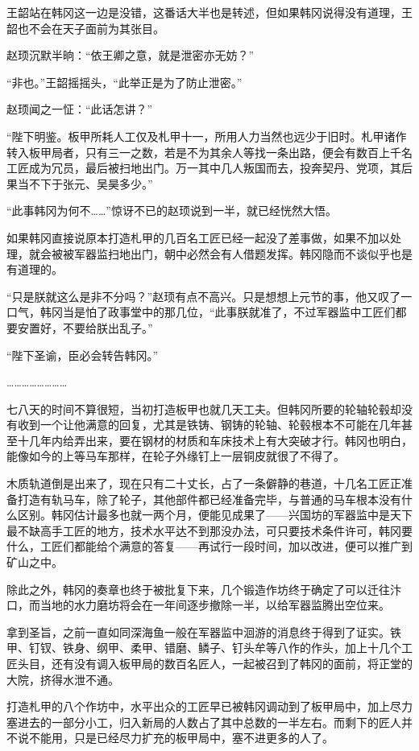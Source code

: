 王韶站在韩冈这一边是没错，这番话大半也是转述，但如果韩冈说得没有道理，王韶也不会在天子面前为其张目。

赵顼沉默半晌：“依王卿之意，就是泄密亦无妨？”

“非也。”王韶摇摇头，“此举正是为了防止泄密。”

赵顼闻之一怔：“此话怎讲？”

“陛下明鉴。板甲所耗人工仅及札甲十一，所用人力当然也远少于旧时。札甲诸作转入板甲局者，只有三一之数，若是不为其余人等找一条出路，便会有数百上千名工匠成为冗员，最后被扫地出门。万一其中几人叛国而去，投奔契丹、党项，其后果当不下于张元、吴昊多少。”

“此事韩冈为何不……”惊讶不已的赵顼说到一半，就已经恍然大悟。

如果韩冈直接说原本打造札甲的几百名工匠已经一起没了差事做，如果不加以处理，就会被被军器监扫地出门，朝中必然会有人借题发挥。韩冈隐而不谈似乎也是有道理的。

“只是朕就这么是非不分吗？”赵顼有点不高兴。只是想想上元节的事，他又叹了一口气，韩冈当是怕了政事堂中的那几位，“此事朕就准了，不过军器监中工匠们都要安置好，不要给朕出乱子。”

“陛下圣谕，臣必会转告韩冈。”

……………………

七八天的时间不算很短，当初打造板甲也就几天工夫。但韩冈所要的轮轴轮毂却没有收到一个让他满意的回复，尤其是铁铸、钢铸的轮轴、轮毂根本不可能在几年甚至十几年内给弄出来，要在钢材的材质和车床技术上有大突破才行。韩冈也明白，能像如今的上等马车那样，在轮子外缘钉上一层铜皮就很了不得了。

木质轨道倒是出来了，现在只有二十丈长，占了一条僻静的巷道，十几名工匠正准备打造有轨马车，除了轮子，其他部件都已经准备完毕，与普通的马车根本没有什么区别。韩冈估计最多也就一两个月，便能见成果了——兴国坊的军器监中是天下最不缺高手工匠的地方，技术水平达不到那没办法，可只要技术条件许可，韩冈要什么，工匠们都能给个满意的答复——再试行一段时间，加以改进，便可以推广到矿山之中。

除此之外，韩冈的奏章也终于被批复下来，几个锻造作坊终于确定了可以迁往汴口，而当地的水力磨坊将会在一年间逐步撤除一半，以给军器监腾出空位来。

拿到圣旨，之前一直如同深海鱼一般在军器监中洄游的消息终于得到了证实。铁甲、钉钗、铁身、纲甲、柔甲、错磨、鳞子、钉头牟等八作的作头，加上十几个工匠头目，还有没有调入板甲局的数百名匠人，一起被召到了韩冈的面前，将正堂的大院，挤得水泄不通。

打造札甲的八个作坊中，水平出众的工匠早已被韩冈调动到了板甲局中，加上尽力塞进去的一部分小工，归入新局的人数占了其中总数的一半左右。而剩下的匠人并不说不能用，只是已经尽力扩充的板甲局中，塞不进更多的人了。


